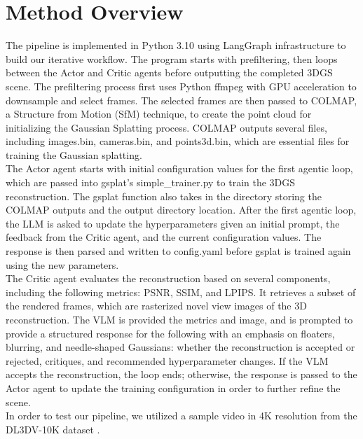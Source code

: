 \section{Method Overview}
\label{sec:method_overview}

The pipeline is implemented in Python 3.10 using LangGraph infrastructure to build our iterative workflow. The program starts with prefiltering, then loops between the Actor and Critic agents before outputting the completed 3DGS scene.
The prefiltering process first uses Python ffmpeg with GPU acceleration to downsample and select frames. The selected frames are then passed to COLMAP, a Structure from Motion (SfM) technique, to create the point cloud for initializing the Gaussian Splatting process. COLMAP outputs several files, including images.bin, cameras.bin, and points3d.bin, which are essential files for training the Gaussian splatting.\\

\noindent The Actor agent starts with initial configuration values for the first agentic loop, which are passed into gsplat’s simple\_trainer.py to train the 3DGS reconstruction. The gsplat function also takes in the directory storing the COLMAP outputs and the output directory location. After the first agentic loop, the LLM is asked to update the hyperparameters given an initial prompt, the feedback from the Critic agent, and the current configuration values. The response is then parsed and written to config.yaml before gsplat is trained again using the new parameters.\\

\noindent The Critic agent evaluates the reconstruction based on several components, including the following metrics: PSNR, SSIM, and LPIPS. It retrieves a subset of the rendered frames, which are rasterized novel view images of the 3D reconstruction. The VLM is provided the metrics and image, and is prompted to provide a structured response for the following with an emphasis on floaters, blurring, and needle-shaped Gaussians: whether the reconstruction is accepted or rejected, critiques, and recommended hyperparameter changes. If the VLM accepts the reconstruction, the loop ends; otherwise, the response is passed to the Actor agent to update the training configuration in order to further refine the scene.\\

\noindent In order to test our pipeline, we utilized a sample video in 4K resolution from the DL3DV-10K dataset \cite{ling2024dl3dv}.
